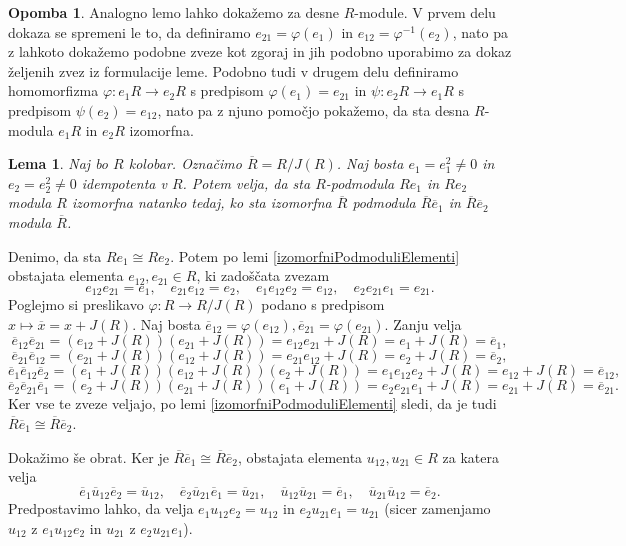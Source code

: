 \documentclass[a4paper, 12pt]{amsart}
\theoremstyle{definition} %
\newtheorem{opomba}[definicija]{Opomba}
\theoremstyle{plain} %
\newtheorem{lema}[definicija]{Lema}
\begin{document}
\begin{opomba} 
Analogno lemo lahko dokažemo za desne $R$-module. V prvem delu dokaza se spremeni le to, da definiramo $e_{21} = \varphi(e_1)$ in $e_{12} = \varphi^{-1} (e_2)$, nato pa z lahkoto dokažemo podobne zveze kot zgoraj in jih podobno uporabimo za dokaz željenih zvez iz formulacije leme. Podobno tudi v drugem delu definiramo homomorfizma $\varphi:e_1 R \rightarrow e_2 R$ s predpisom $\varphi(e_1) = e_{21}$ in $\psi : e_2R \rightarrow e_1 R$ s predpisom $\psi(e_2) = e_{12}$, nato pa z  njuno pomočjo pokažemo, da sta desna $R$-modula $e_1 R$ in $e_2 R$ izomorfna.
\end{opomba}

\begin{lema}
\label{izomorfniPodmoduliKvocient}
Naj bo $R$ kolobar. Označimo $\overline{R} = R/J(R)$. Naj bosta $e_1 = e_1^2 \neq 0$ in $e_2  =  e_2^2 \neq 0 $ idempotenta v $R$. Potem velja, da sta $R$-podmodula $Re_1$ in $Re_2$ modula $R$ izomorfna natanko tedaj, ko sta izomorfna $\overline{R}$ podmodula $ \overline{R}\overline{e}_1$ in $ \overline{R} \overline{e}_2$ modula $\overline{R}$. 
\end{lema}

\proof
Denimo, da sta $R e_1 \cong Re_2$. Potem po lemi \ref{izomorfniPodmoduliElementi} obstajata elementa $e_{12}, e_{21} \in R$, ki zadoščata zvezam
$$
e_{12}e_{21} = e_1, \quad e_{21}e_{12} = e_2, \quad  e_1 e_{12} e_2 = e_{12}, \quad e_2 e_{21} e_1 = e_{21}.
$$
Poglejmo si preslikavo $\varphi: R\rightarrow R/J(R)$ podano s predpisom $x\mapsto \overline{x} = x+J(R)$. Naj bosta $\overline{e}_{12} = \varphi(e_{12}), \overline{e}_{21} = \varphi(e_{21})$. Zanju velja
$$
\overline{e}_{12} \overline{e}_{21} = (e_{12} + J(R))(e_{21} + J(R)) = e_{12} e_{21} + J(R) = e_1 + J(R) = \overline{e}_1,
$$
$$
\overline{e}_{21} \overline{e}_{12} = (e_{21} + J(R))(e_{12} + J(R)) = e_{21} e_{12} + J(R)  = e_2 + J(R) = \overline{e}_2,
$$
$$
\overline{e}_1 \overline{e}_{12} \overline{e}_2 = (e_1 + J(R)) (e_{12} + J(R)) (e_2 + J(R)) = e_1 e_{12} e_2 + J(R) = e_{12} + J(R) = \overline{e}_{12},
$$
$$
\overline{e}_2 \overline{e}_{21} \overline{e}_1 = (e_2 + J(R)) (e_{21} + J(R)) (e_1 + J(R)) = e_2 e_{21} e_1 + J(R) = e_{21} + J(R) = \overline{e}_{21}.
$$
Ker vse te zveze veljajo, po lemi \ref{izomorfniPodmoduliElementi} sledi, da je tudi $\overline{R} \overline{e}_1 \cong \overline{R}\overline{e}_2$.

Dokažimo še obrat. Ker je $\overline{R}\overline{e}_1 \cong \overline{R}\overline{e}_2$, obstajata elementa $u_{12},u_{21} \in R$ za katera velja 
$$
\overline{e}_1 \overline{u}_{12}\overline{e}_2 = \overline{u}_{12}, \quad \overline{e}_2 \overline{u}_{21} \overline{e}_1 = \overline{u}_{21}, \quad \overline{u}_{12}\overline{u}_{21} = \overline{e}_1, \quad \overline{u}_{21} \overline{u}_{12} = \overline{e}_2.
$$
Predpostavimo lahko, da velja $e_1 u_{12} e_2 = u_{12} $ in $e_2 u_{21} e_1 = u_{21}$ (sicer zamenjamo $u_{12}$ z $e_1 u_{12} e_2$ in $u_{21}$ z $e_2 u_{21} e_1$).
\end{document}
